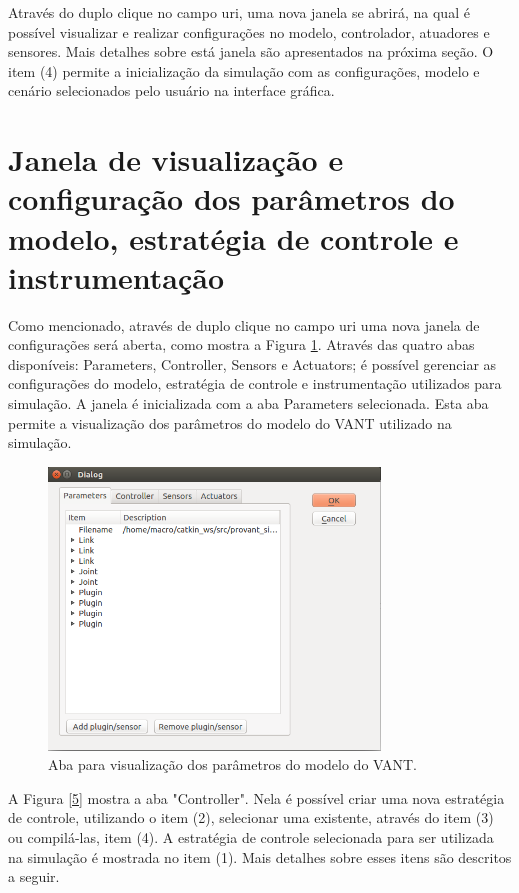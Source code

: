 \noindent Através do duplo clique no campo uri, uma nova janela se abrirá, na qual é possível visualizar e realizar configurações no modelo, controlador, atuadores e sensores. Mais detalhes sobre está janela são apresentados na próxima seção. O item (4) permite a inicialização da simulação com as configurações, modelo e cenário selecionados pelo usuário na interface gráfica.


\section{Janela de visualização e configuração dos parâmetros do modelo, estratégia de controle e instrumentação}
\label{SecEstCtrl}

Como mencionado, através de duplo clique no campo uri uma nova janela de configurações será aberta, como mostra a Figura \ref{4}. Através das quatro abas disponíveis: Parameters, Controller, Sensors e Actuators; é possível gerenciar as configurações do modelo, estratégia de controle e instrumentação utilizados para simulação. A janela é inicializada com a aba Parameters selecionada. Esta aba permite a visualização dos parâmetros do modelo do VANT utilizado na simulação.

\begin{figure}[!ht]
	\centering
	\includegraphics[width=250pt]{figuras/4.png}
	\caption{Aba para visualização dos parâmetros do modelo do VANT.}
	\label{4}
\end{figure}

A Figura \ref{5} mostra a aba "Controller". Nela é possível criar uma nova estratégia de controle, utilizando o item (2), selecionar uma existente, através do item (3) ou compilá-las, item (4). A estratégia de controle selecionada para ser utilizada na simulação é mostrada no item (1). Mais detalhes sobre esses itens são descritos a seguir.

